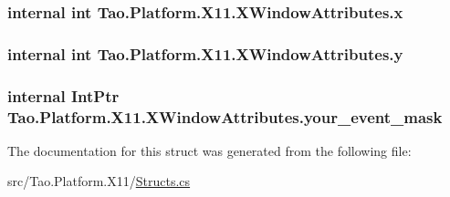 \label{struct_tao_1_1_platform_1_1_x11_1_1_x_window_attributes_ae85f9d9c904fbb6283f3e7dacc197a93}
\hypertarget{struct_tao_1_1_platform_1_1_x11_1_1_x_window_attributes_a7201d01dc5d7da3a23a33f0a0be01276}{
\subsubsection[{x}]{\setlength{\rightskip}{0pt plus 5cm}internal int {\bf Tao.Platform.X11.XWindowAttributes.x}}}
\label{struct_tao_1_1_platform_1_1_x11_1_1_x_window_attributes_a7201d01dc5d7da3a23a33f0a0be01276}
\hypertarget{struct_tao_1_1_platform_1_1_x11_1_1_x_window_attributes_a8781281ba606a2a1c6ab58bb76a550b6}{
\subsubsection[{y}]{\setlength{\rightskip}{0pt plus 5cm}internal int {\bf Tao.Platform.X11.XWindowAttributes.y}}}
\label{struct_tao_1_1_platform_1_1_x11_1_1_x_window_attributes_a8781281ba606a2a1c6ab58bb76a550b6}
\hypertarget{struct_tao_1_1_platform_1_1_x11_1_1_x_window_attributes_a5bd26cbf3962f9d3ff80a6ab4941a8b2}{
\subsubsection[{your\_\-event\_\-mask}]{\setlength{\rightskip}{0pt plus 5cm}internal IntPtr {\bf Tao.Platform.X11.XWindowAttributes.your\_\-event\_\-mask}}}
\label{struct_tao_1_1_platform_1_1_x11_1_1_x_window_attributes_a5bd26cbf3962f9d3ff80a6ab4941a8b2}


The documentation for this struct was generated from the following file:\begin{DoxyCompactItemize}
\item 
src/Tao.Platform.X11/\hyperlink{_structs_8cs}{Structs.cs}\end{DoxyCompactItemize}
